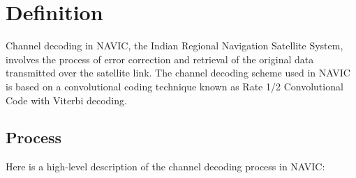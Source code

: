 \documentclass[10pt, onecolumn]{article}
\title{\mytitle}
\author{\myauthor\hspace{1em}\\\contact\\FWC22089 -\hspace{0.5em}IITH\hspace{0.5em}\mymodule\hspace{6em}}
\begin{document}
\maketitle
\section{Definition}
Channel decoding in NAVIC, the Indian Regional Navigation Satellite System, involves the process of error correction and retrieval of the original data transmitted over the satellite link. The channel decoding scheme used in NAVIC is based on a convolutional coding technique known as Rate 1/2 Convolutional Code with Viterbi decoding.
\subsection{Process}
Here is a high-level description of the channel decoding process in NAVIC:


\end{document}
